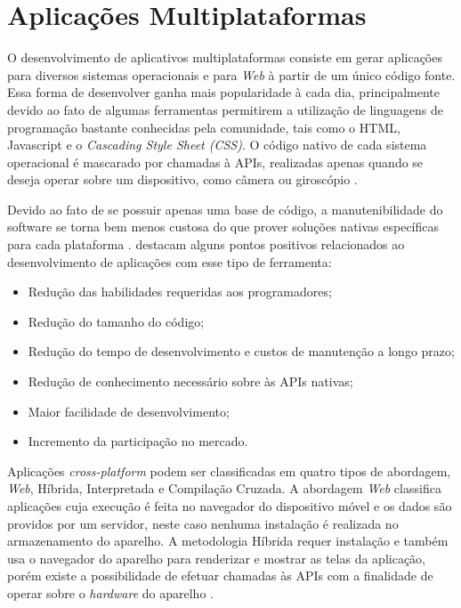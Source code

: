 \section{Aplicações Multiplataformas}

O desenvolvimento de aplicativos multiplataformas consiste em gerar aplicações para diversos sistemas operacionais e para \textit{Web} à partir de um único código fonte. Essa forma de desenvolver ganha mais popularidade à cada dia, principalmente devido ao fato de algumas ferramentas permitirem a utilização de linguagens de programação bastante conhecidas pela comunidade, tais como o HTML, Javascript e o \textit{Cascading Style Sheet (CSS)}. O código nativo de cada sistema operacional é mascarado por chamadas à APIs, realizadas apenas quando se deseja operar sobre um dispositivo, como câmera ou giroscópio \cite{raj2012study, palmieri2012comparison, dalmasso2013survey}.

Devido ao fato de se possuir apenas uma base de código, a manutenibilidade do software se torna bem menos custosa do que prover soluções nativas específicas para cada plataforma \cite{raj2012study}.  destacam alguns pontos positivos relacionados ao desenvolvimento de aplicações com esse tipo de ferramenta:

\begin{itemize}
\item Redução das habilidades requeridas aos programadores;
\item Redução do tamanho do código;
\item Redução do tempo de desenvolvimento e custos de manutenção a longo prazo;
\item Redução de conhecimento necessário sobre às APIs nativas;
\item Maior facilidade de desenvolvimento;
\item Incremento da participação no mercado.
\end{itemize}


Aplicações \textit{cross-platform} podem ser classificadas em quatro tipos de abordagem, \textit{Web}, Híbrida, Interpretada e Compilação Cruzada. A abordagem \textit{Web} classifica aplicações cuja execução é feita no navegador do dispositivo móvel e os dados são providos por um servidor, neste caso nenhuma instalação é realizada no armazenamento do aparelho. A metodologia Híbrida requer instalação e também usa o navegador do aparelho para renderizar e mostrar as telas da aplicação, porém existe a possibilidade de efetuar chamadas às APIs com a finalidade de operar sobre o \textit{hardware} do aparelho \cite{raj2012study, dalmasso2013survey}.

